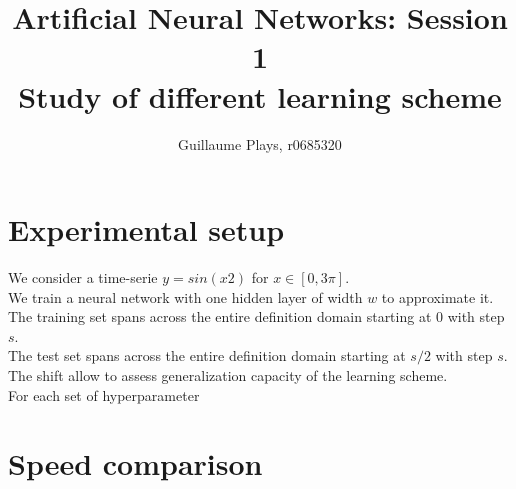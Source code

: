 \documentclass[a4paper]{article}
\title{Artificial Neural Networks: Session 1 \\ 
		\large Study of different learning scheme}
\author{Guillaume Plays, r0685320}
\date{}
\begin{document}
\maketitle


\section{Experimental setup}

We consider a time-serie $ y = sin(x2)$ for $x\in [0,3\pi] $. \\
We train a neural network with one hidden layer of width $w$ to approximate it. \\
The training set spans across the entire definition domain starting at $0$ with step $s$. \\
The test set spans across the entire definition domain starting at $s/2$ with step $s$. \\
The shift allow to assess generalization capacity of the learning scheme. \\
For each set of hyperparameter


\section{Speed comparison}
\end{document}
